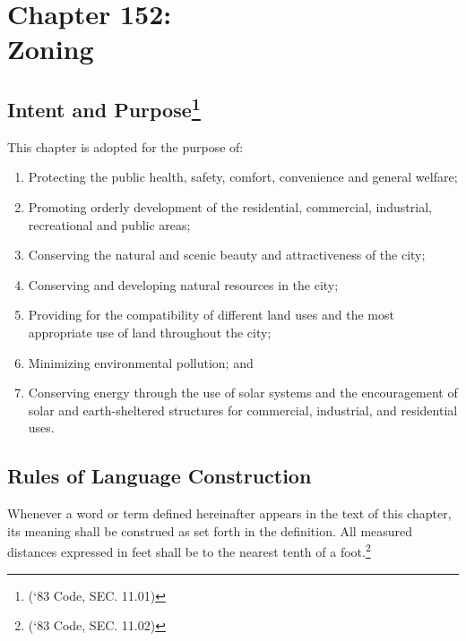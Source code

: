 \chapter*{Chapter 152: \\
	Zoning}
    \minitoc
    \pagebreak


\section{Intent and Purpose\footnote{(‘83 Code, SEC. 11.01)}}
This chapter is adopted for the purpose of:
\begin{enumerate}[{\indent}A)]
    \item Protecting the public health, safety, comfort, convenience and general welfare; 
    \item Promoting orderly development of the residential, commercial, industrial, recreational and public areas; 
    \item Conserving the natural and scenic beauty and attractiveness of the city; 
    \item Conserving and developing natural resources in the city; 
    \item Providing for the compatibility of different land uses and the most appropriate use of land throughout the city; 
    \item Minimizing environmental pollution; and
    \item Conserving energy through the use of solar systems and the encouragement of solar and earth-sheltered structures for commercial, industrial, and residential uses.
\end{enumerate}
\section{Rules of Language Construction}
Whenever a word or term defined hereinafter appears in the text of this chapter, its meaning shall be construed as set forth in the definition. All measured distances expressed in feet shall be to the nearest tenth of a foot.\footnote{(‘83 Code, SEC. 11.02)}
